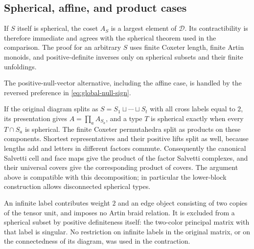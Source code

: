 \subsection{Spherical, affine, and product cases}

If $S$ itself is spherical, the coset $A_S$ is a largest element of
$\mathcal D$.  Its contractibility is therefore immediate and agrees
with the spherical theorem used in the comparison.  The proof for an
arbitrary $S$ uses finite Coxeter length, finite Artin monoids, and
positive-definite inverses only on spherical subsets and their finite
unfoldings.

The positive-null-vector alternative, including the affine case, is
handled by the reversed preference in \eqref{eq:global-null-sign}.

If the original diagram splits as $S=S_1\sqcup\cdots\sqcup S_t$ with
all cross labels equal to $2$, its presentation gives
$A=\prod_a A_{S_a}$, and a type $T$ is spherical exactly when every
$T\cap S_a$ is spherical.  The finite Coxeter permutahedra split as
products on these components.  Shortest representatives and their
positive lifts split as well, because lengths add and letters in
different factors commute.  Consequently the canonical Salvetti cell
and face maps give the product of the factor Salvetti complexes, and
their universal covers give the corresponding product of covers.  The
argument above is compatible with this decomposition; in particular
the lower-block construction allows disconnected spherical types.

An infinite label contributes weight $2$ and an edge object consisting
of two copies of the tensor unit, and imposes no Artin braid relation.  It is
excluded from a spherical subset by positive definiteness itself: the
two-color principal matrix with that label is singular.  No restriction
on infinite labels in the original matrix, or on the connectedness of
its diagram, was used in the contraction.
